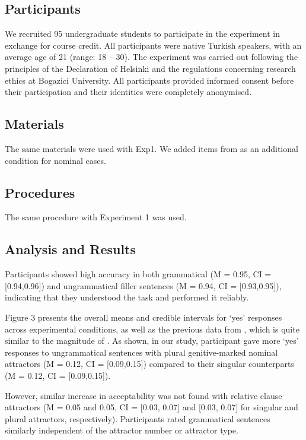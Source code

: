 \documentclass[
  authoryear,
  preprint]{elsarticle}
\begin{document}
\subsection{Participants}\label{participants-1}

We recruited 95 undergraduate students to participate in the experiment
in exchange for course credit. All participants were native Turkish
speakers, with an average age of 21 (range: 18 -- 30). The experiment
was carried out following the principles of the Declaration of Helsinki
and the regulations concerning research ethics at Bogazici University.
All participants provided informed consent before their participation
and their identities were completely anonymised.

\subsection{Materials}\label{materials-1}

The same materials were used with Exp1. We added items from
\citet{TurkLogacev2024} as an additional condition for nominal cases.

\subsection{Procedures}\label{procedures-1}

The same procedure with Experiment 1 was used.

\subsection{Analysis and Results}\label{analysis-and-results-1}

Participants showed high accuracy in both grammatical (M = 0.95, CI =
{[}0.94,0.96{]}) and ungrammatical filler sentences (M = 0.94, CI =
{[}0.93,0.95{]}), indicating that they understood the task and performed
it reliably.

Figure 3 presents the overall means and credible intervals for `yes'
responses across experimental conditions, as well as the previous data
from \citet{TurkLogacev2024}, which is quite similar to the magnitude of
\citet{LagoEtAl2019}. As shown, in our study, participant gave more
`yes' responses to ungrammatical sentences with plural genitive-marked
nominal attractors (M = 0.12, CI = {[}0.09,0.15{]}) compared to their
singular counterparts (M = 0.12, CI = {[}0.09,0.15{]}).

However, similar increase in acceptability was not found with relative
clause attractors (M = 0.05 and 0.05, CI = {[}0.03, 0.07{]} and {[}0.03,
0.07{]} for singular and plural attractors, respectively). Participants
rated grammatical sentences similarly independent of the attractor
number or attractor type.
\end{document}
